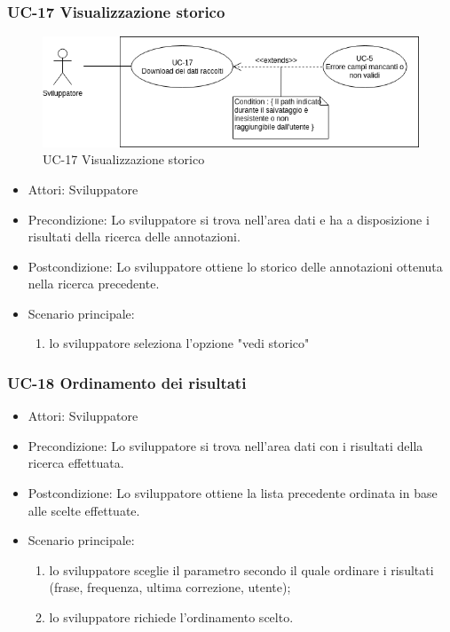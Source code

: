	\subsubsection{UC-17 Visualizzazione storico}
		\begin{figure}[h]
			\centering
			\includegraphics[scale=0.7]{images/UC-17.png}
			\caption{UC-17 Visualizzazione storico}
		\end{figure}	
		\begin{itemize}
			\item Attori: Sviluppatore
			\item Precondizione: Lo sviluppatore si trova nell'area dati e ha a disposizione i risultati della ricerca delle annotazioni.
			\item Postcondizione: Lo sviluppatore ottiene lo storico delle annotazioni ottenuta nella ricerca precedente.
			\item Scenario principale:
			\begin{enumerate}
				\item lo sviluppatore seleziona l'opzione "vedi storico"
			\end{enumerate}
		\end{itemize}
		
	\subsubsection{UC-18 Ordinamento dei risultati}
		\begin{itemize}
			\item Attori: Sviluppatore
			\item Precondizione: Lo sviluppatore si trova nell'area dati con i risultati della ricerca effettuata.
			\item Postcondizione: Lo sviluppatore ottiene la lista precedente ordinata in base alle scelte effettuate.
			\item Scenario principale:
				\begin{enumerate}
					\item lo sviluppatore sceglie il parametro secondo il quale ordinare i risultati (frase, frequenza, ultima correzione, utente);
					\item lo sviluppatore richiede l'ordinamento scelto.
				\end{enumerate}
		\end{itemize} 
	

